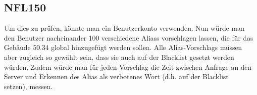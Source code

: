 \subsection*{NFL150}
Um dies zu prüfen, könnte man ein \Gls{Benutzer}konto verwenden. Nun würde man den \Gls{Benutzer} nacheinander 100 verschiedene \Glspl{Alias} vorschlagen lassen, die für das Gebäude 50.34 \gls{global} hinzugefügt werden sollen. Alle \Glspl{Alias-Vorschlag} müssen aber zugleich so gewählt sein, dass sie auch auf der \Gls{Blacklist} gesetzt werden würden. Zudem würde man für jeden Vorschlag die Zeit zwischen Anfrage an den \Gls{Server} und Erkennen des \Gls{Alias} als verbotenes Wort (d.h. auf der \Gls{Blacklist} setzen), messen.